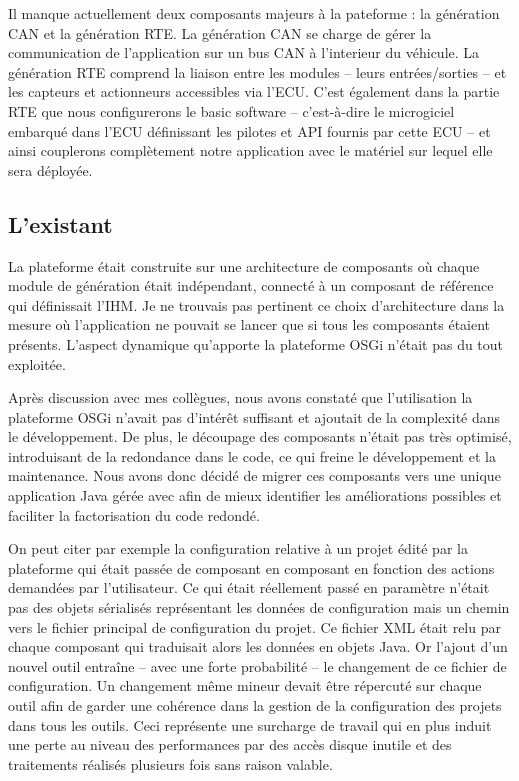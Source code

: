 Il manque actuellement deux composants majeurs à la pateforme : la génération
CAN et la génération RTE. La génération CAN se charge de gérer la communication
de l'application sur un bus CAN à l'interieur du véhicule. La génération RTE
comprend la liaison entre les modules -- leurs entrées/sorties -- et les
capteurs et actionneurs accessibles via l'ECU. C'est également dans la partie
RTE que nous configurerons le \og basic software \fg{} -- c'est-à-dire le
microgiciel embarqué dans l'ECU définissant les pilotes et API fournis par cette
ECU -- et ainsi couplerons complètement notre application avec le matériel sur
lequel elle sera déployée.

\subsection{L'existant}
La plateforme était construite sur une architecture de composants 
où chaque module de génération était indépendant, connecté à un composant de
référence qui définissait l'IHM. Je ne trouvais pas pertinent ce choix
d'architecture dans la mesure où l'application ne pouvait se lancer que si tous
les composants étaient présents. L'aspect dynamique qu'apporte la plateforme
OSGi n'était pas du tout exploitée.

Après discussion avec mes collègues, nous avons constaté que l'utilisation la
plateforme OSGi n'avait pas d'intérêt suffisant et ajoutait de la complexité
dans le développement. De plus, le découpage des composants n'était pas très
optimisé, introduisant de la redondance dans le code, ce qui freine le
développement et la maintenance. Nous avons donc décidé de migrer ces composants
vers une unique application Java gérée avec  afin de mieux
identifier les améliorations possibles et faciliter la factorisation du code
redondé.

On peut citer par exemple la configuration relative à un projet édité par la
plateforme qui était passée de composant en composant en fonction des actions
demandées par l'utilisateur. Ce qui était réellement passé en paramètre n'était
pas des objets sérialisés représentant les données de configuration mais un
chemin vers le fichier principal de configuration du projet. Ce fichier XML
était relu par chaque composant qui traduisait alors les données en objets Java.
Or l'ajout d'un nouvel outil entraîne -- avec une forte probabilité -- le
changement de ce fichier de configuration. Un changement même mineur devait être
répercuté sur chaque outil afin de garder une cohérence dans la gestion de la
configuration des projets dans tous les outils. Ceci représente une surcharge de
travail qui en plus induit une perte au niveau des performances par des accès
disque inutile et des traitements réalisés plusieurs fois sans raison valable.

